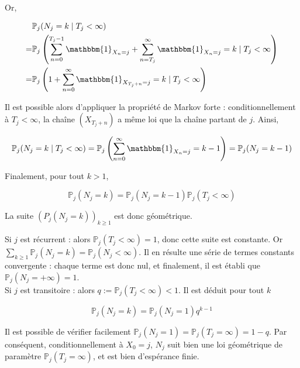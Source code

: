 \begin{sloppypar}
Or,

\begin{equation}
    \begin{split}
&\mathbb{P}_j(N_j = k \mid T_j < \infty) \\
= &\mathbb{P}_j \left( \sum_{n=0}^{T_j - 1} \mathbbm{1}_{X_n = j} + \sum_{n=T_j}^{\infty} \mathbbm{1}_{X_n = j} = k \mid T_j < \infty \right) \\
= & \mathbb{P}_j \left( 1 + \sum_{n=0}^{\infty} \mathbbm{1}_{X_{T_j + n} = j} = k \mid T_j < \infty \right)
    \end{split}
\end{equation}

Il est possible alors d'appliquer la propriété de Markov forte : conditionnellement à $T_j < \infty$, la chaîne $(X_{T_j + n})$ a même loi que la chaîne partant de $j$. Ainsi,

\begin{equation}
\mathbb{P}_j(N_j = k \mid T_j < \infty) = \mathbb{P}_j \left( \sum_{n=0}^{\infty} \mathbbm{1}_{X_n = j} = k - 1 \right) = \mathbb{P}_j(N_j = k - 1)  
\end{equation}

Finalement, pour tout $k > 1$, 

\begin{equation}
\mathbb{P}_j(N_j = k) = \mathbb{P}_j(N_j = k - 1) \mathbb{P}_j(T_j < \infty)   
\end{equation}

La suite $(P_j(N_j = k))_{k \geq 1}$ est donc géométrique.

Si $j$ est récurrent : alors $\mathbb{P}_j(T_j < \infty) = 1$, donc cette suite est constante. Or $\sum_{k \geq 1} \mathbb{P}_j(N_j = k) = \mathbb{P}_j(N_j < \infty)$. Il en résulte une série de termes constants convergente : chaque terme est donc nul, et 
finalement, il est établi que $\mathbb{P}_j(N_j = +\infty) = 1$.\\

Si $j$ est transitoire : alors $q := \mathbb{P}_j(T_j < \infty) < 1$. Il est déduit pour tout $k$

\begin{equation}
\mathbb{P}_j(N_j = k) = \mathbb{P}_j(N_j = 1) q^{k - 1}
\end{equation}

Il est possible de vérifier facilement $\mathbb{P}_j(N_j = 1) = \mathbb{P}_j(T_j = \infty) = 1 - q$. Par conséquent, conditionnellement à $X_0 = j$, $N_j$ suit bien une loi géométrique de paramètre $\mathbb{P}_j(T_j = \infty)$, et est bien d’espérance finie.


\end{sloppypar}
